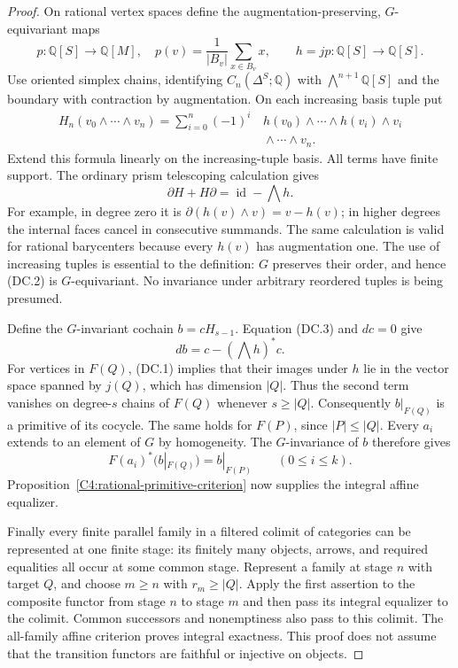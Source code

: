 \begin{proof}
On rational vertex spaces define the augmentation-preserving,
$G$-equivariant maps
\[
 p:\mathbb Q[S]\longrightarrow\mathbb Q[M],
 \quad p(v)=\frac1{|B_v|}\sum_{x\in B_v}x,
 \qquad h=jp:\mathbb Q[S]\longrightarrow\mathbb Q[S].
\]
Use oriented simplex chains, identifying
$C_n(\Delta^S;\mathbb Q)$ with
$\bigwedge^{n+1}\mathbb Q[S]$ and the boundary with contraction
by augmentation. On each increasing basis tuple put
\[
\begin{split}
 H_n(v_0\wedge\cdots\wedge v_n)
 =\sum_{i=0}^n(-1)^i\,&h(v_0)\wedge\cdots\wedge h(v_i)\wedge v_i
 \\[-2pt]
 &{}\wedge\cdots\wedge v_n .
\end{split}
\tag{DC.2}
\]
Extend this formula linearly on the increasing-tuple basis. All
terms have finite support. The ordinary prism telescoping calculation
gives
\[
 \partial H+H\partial=\operatorname{id}-\bigwedge h.
 \tag{DC.3}
\]
For example, in degree zero it is
$\partial(h(v)\wedge v)=v-h(v)$; in higher degrees the internal
faces cancel in consecutive summands. The same calculation is valid
for rational barycenters because every $h(v)$ has augmentation one.
The use of increasing tuples is essential to the definition:
$G$ preserves their order, and hence (DC.2) is $G$-equivariant.
No invariance under arbitrary reordered tuples is being presumed.

Define the $G$-invariant cochain $b=cH_{s-1}$. Equation (DC.3) and
$dc=0$ give
\[
 db=c-(\bigwedge h)^*c.
\]
For vertices in $F(Q)$, (DC.1) implies that their images under $h$
lie in the vector space spanned by $j(Q)$, which has dimension
$|Q|$. Thus the second term vanishes on degree-$s$ chains of
$F(Q)$ whenever $s\geq |Q|$. Consequently $b|_{F(Q)}$ is a
primitive of its cocycle. The same holds for $F(P)$, since
$|P|\leq |Q|$. Every $a_i$ extends to an element of $G$ by
homogeneity. The $G$-invariance of $b$ therefore gives
\[
 F(a_i)^*(b|_{F(Q)})=b|_{F(P)}
 \qquad(0\leq i\leq k).
\]
Proposition~\ref{C4:rational-primitive-criterion} now supplies the
integral affine equalizer.

Finally every finite parallel family in a filtered colimit of
categories can be represented at one finite stage: its finitely
many objects, arrows, and required equalities all occur at some
common stage. Represent a family at stage $n$ with target $Q$,
and choose $m\geq n$ with $r_m\geq |Q|$. Apply the first assertion
to the composite functor from stage $n$ to stage $m$ and then
pass its integral equalizer to the colimit. Common successors and
nonemptiness also pass to this colimit. The all-family affine
criterion proves integral exactness. This proof does not assume
that the transition functors are faithful or injective on objects.
\end{proof}

